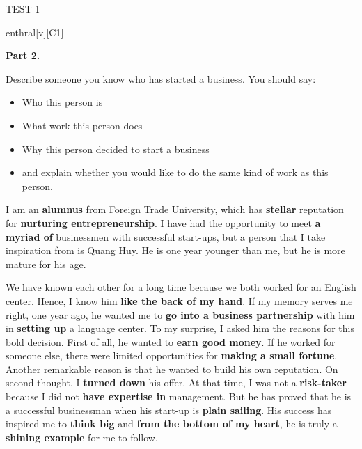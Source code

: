 \begin{glossarymc}[Cambridge 13]
\begin{test}{TEST 1}
\begin{VocabExplain}[Part 1]
            \begin{ExplainCard}{enthral}[v][C1]
            \end{ExplainCard}
        \end{VocabExplain}

    \noindent
    \textbf{Part 2.}
    \begin{qa}{Describe someone you know who has started a business. You should say: 
    \begin{itemize}
        \item Who this person is
        \item What work this person does
        \item Why this person decided to start a business
        \item and explain whether you would like to do the same kind of work as this person.
    \end{itemize}}

    I am an \textbf{alumnus} from Foreign Trade University, which has \textbf{stellar} reputation for \textbf{nurturing entrepreneurship}. I have had the opportunity to meet \textbf{a myriad of} businessmen with successful start-ups, but a person that I take inspiration from is Quang Huy. He is one year younger than me, but he is more mature for his age.

    We have known each other for a long time because we both worked for an English center. Hence, I know him \textbf{like the back of my hand}. If my memory serves me right, one year ago, he wanted me to \textbf{go into a business partnership} with him in \textbf{setting up} a language center. To my surprise, I asked him the reasons for this bold decision. First of all, he wanted to \textbf{earn good money}. If he worked for someone else, there were limited opportunities for \textbf{making a small fortune}. Another remarkable reason is that he wanted to build his own reputation. On second thought, I \textbf{turned down} his offer. At that time, I was not a \textbf{risk-taker} because I did not \textbf{have expertise in} management. But he has proved that he is a successful businessman when his start-up is \textbf{plain sailing}. His success has inspired me to \textbf{think big} and \textbf{from the bottom of my heart}, he is truly a \textbf{shining example} for me to follow.
    \end{qa}


\end{test}
\end{glossarymc}
